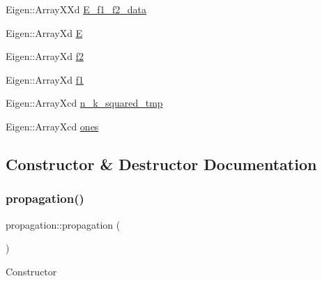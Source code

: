 \begin{DoxyCompactItemize}
\item 
Eigen\+::\+Array\+X\+Xd \mbox{\hyperlink{classpropagation_a53ab4838e0e66b55c2ab1398389a22f5}{E\+\_\+f1\+\_\+f2\+\_\+data}}
\item 
Eigen\+::\+Array\+Xd \mbox{\hyperlink{classpropagation_aff3713e9170542e31c952a2d1b760eec}{E}}
\item 
Eigen\+::\+Array\+Xd \mbox{\hyperlink{classpropagation_a747dcaf8f7405a17af992bae39b7fab5}{f2}}
\item 
Eigen\+::\+Array\+Xd \mbox{\hyperlink{classpropagation_a14d6e72396c1c354c6d9986f2d79f85f}{f1}}
\item 
Eigen\+::\+Array\+Xcd \mbox{\hyperlink{classpropagation_a0dd11d293dfb8060a3716610650d5aac}{n\+\_\+k\+\_\+squared\+\_\+tmp}}
\item 
Eigen\+::\+Array\+Xcd \mbox{\hyperlink{classpropagation_ac45df99836353b45ff1ddb3c22f7f9f8}{ones}}
\end{DoxyCompactItemize}


\subsection{Constructor \& Destructor Documentation}
\mbox{\label{classpropagation_a9d7b9f42ce1c0bc741d3016a07ba13f7}} 
\subsubsection{\texorpdfstring{propagation()}{propagation()}\hspace{0.1cm}{\footnotesize\ttfamily [1/2]}}
{\footnotesize\ttfamily propagation\+::propagation (\begin{DoxyParamCaption}{ }\end{DoxyParamCaption})}

Constructor \mbox{\label{classpropagation_a83d9af4c672b33155f87756647cd9ada}} 
